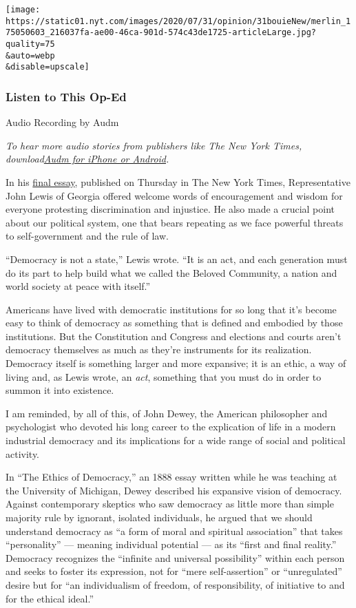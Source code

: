 \texttt{[image: https://static01.nyt.com/images/2020/07/31/opinion/31bouieNew/merlin\_175050603\_216037fa-ae00-46ca-901d-574c43de1725-articleLarge.jpg?quality=75\\\&auto=webp\\\&disable=upscale]}

\hypertarget{listen-to-this-op-ed}{%
\subsubsection{Listen to This Op-Ed}\label{listen-to-this-op-ed}}

Audio Recording by Audm

\emph{To hear more audio stories from publishers like The New York
Times,
download}\href{https://www.audm.com/?utm_source=nytopinion\&utm_medium=embed\&utm_campaign=trump_democracy_lewis}{\emph{Audm
for iPhone or Android}}\emph{.}

In his
\href{https://www.nytimes.com/2020/07/30/opinion/john-lewis-civil-rights-america.html}{final
essay}, published on Thursday in The New York Times, Representative John
Lewis of Georgia offered welcome words of encouragement and wisdom for
everyone protesting discrimination and injustice. He also made a crucial
point about our political system, one that bears repeating as we face
powerful threats to self-government and the rule of law.

``Democracy is not a state,'' Lewis wrote. ``It is an act, and each
generation must do its part to help build what we called the Beloved
Community, a nation and world society at peace with itself.''

Americans have lived with democratic institutions for so long that it's
become easy to think of democracy as something that is defined and
embodied by those institutions. But the Constitution and Congress and
elections and courts aren't democracy themselves as much as they're
instruments for its realization. Democracy itself is something larger
and more expansive; it is an ethic, a way of living and, as Lewis wrote,
an \emph{act}, something that you must do in order to summon it into
existence.

I am reminded, by all of this, of John Dewey, the American philosopher
and psychologist who devoted his long career to the explication of life
in a modern industrial democracy and its implications for a wide range
of social and political activity.

In ``The Ethics of Democracy,'' an 1888 essay written while he was
teaching at the University of Michigan, Dewey described his expansive
vision of democracy. Against contemporary skeptics who saw democracy as
little more than simple majority rule by ignorant, isolated individuals,
he argued that we should understand democracy as ``a form of moral and
spiritual association'' that takes ``personality'' --- meaning
individual potential --- as its ``first and final reality.'' Democracy
recognizes the ``infinite and universal possibility'' within each person
and seeks to foster its expression, not for ``mere self-assertion'' or
``unregulated'' desire but for ``an individualism of freedom, of
responsibility, of initiative to and for the ethical ideal.''

